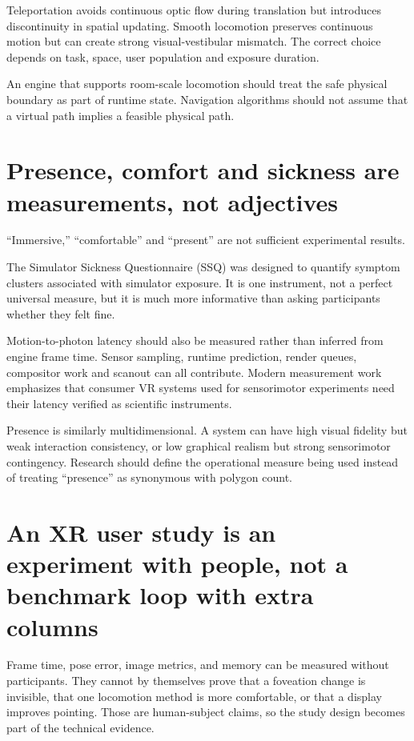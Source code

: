 Teleportation avoids continuous optic flow during translation but introduces discontinuity in spatial updating. Smooth locomotion preserves continuous motion but can create strong visual-vestibular mismatch. The correct choice depends on task, space, user population and exposure duration.

An engine that supports room-scale locomotion should treat the safe physical boundary as part of runtime state. Navigation algorithms should not assume that a virtual path implies a feasible physical path.

\section{Presence, comfort and sickness are measurements, not adjectives}\label{04-visual-computing-ii-ch035-presence-comfort-and-sickness-are-measurements-not-adjectives}

``Immersive,'' ``comfortable'' and ``present'' are not sufficient experimental results.

The Simulator Sickness Questionnaire (SSQ) was designed to quantify symptom clusters associated with simulator exposure. It is one instrument, not a perfect universal measure, but it is much more informative than asking participants whether they felt fine.

Motion-to-photon latency should also be measured rather than inferred from engine frame time. Sensor sampling, runtime prediction, render queues, compositor work and scanout can all contribute. Modern measurement work emphasizes that consumer VR systems used for sensorimotor experiments need their latency verified as scientific instruments.

Presence is similarly multidimensional. A system can have high visual fidelity but weak interaction consistency, or low graphical realism but strong sensorimotor contingency. Research should define the operational measure being used instead of treating ``presence'' as synonymous with polygon count.

\section{An XR user study is an experiment with people, not a benchmark loop with extra columns}\label{04-visual-computing-ii-ch035-an-xr-user-study-is-an-experiment-with-people-not-a-benchmark-loop-with-extra-columns}

Frame time, pose error, image metrics, and memory can be measured without participants. They cannot by themselves prove that a foveation change is invisible, that one locomotion method is more comfortable, or that a display improves pointing. Those are human-subject claims, so the study design becomes part of the technical evidence.

